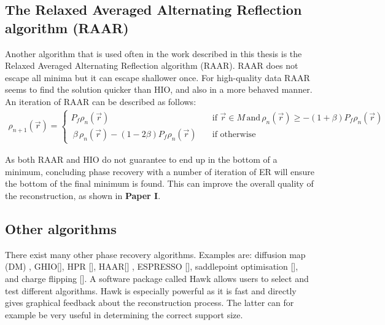 \subsection{The Relaxed Averaged Alternating Reflection algorithm (RAAR)}
Another algorithm that is used often in the work described in this thesis is the Relaxed Averaged Alternating Reflection algorithm (RAAR). RAAR does not escape all minima but it can escape shallower once. For high-quality data RAAR seems to find the solution quicker than HIO, and also in a more behaved manner. An iteration of RAAR can be described as follows:
\begin{align}
\rho_{n+1}\left(\vec{r}\right) = \begin{cases} P_f \rho_{n}\left(\vec{r}\right) \quad & \mathrm{if} \,\,
    \vec{r} \in M\,\mathrm{and}\,\rho_n(\vec{r}) \geq -(1+\beta)P_f\rho_n(\vec{r}) \\\
    \beta\,\rho_n(\vec{r}) -(1-2\beta) P_f \rho_n(\vec{r}) \quad & \mathrm{if}\,\, \mathrm{otherwise} \end{cases}
\end{align}

As both RAAR and HIO do not guarantee to end up in the bottom of a minimum, concluding phase recovery with a number of iteration of ER will ensure the bottom of the final minimum is found. This can improve the overall quality of the reconstruction, as shown in \textbf{Paper I}.

\subsection{Other algorithms}
There exist many other phase recovery algorithms. Examples are: diffusion map (DM) \cite{Elser}, GHIO[], HPR [], HAAR[] , ESPRESSO [], saddlepoint optimisation [], and charge flipping []. A software package called Hawk allows users to select and test different algorithms. Hawk is especially powerful as it is fast and directly gives graphical feedback about the reconstruction process. The latter can for example be very useful in determining the correct support size. 

